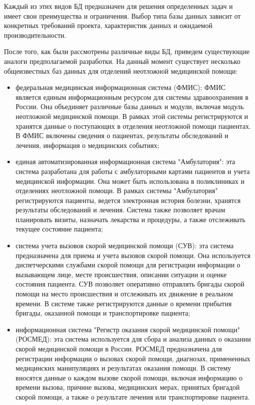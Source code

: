 Каждый из этих видов БД предназначен для решения определенных задач и имеет свои преимущества и ограничения. Выбор типа базы данных зависит от конкретных требований проекта, характеристик данных и ожидаемой производительности.

После того, как были рассмотрены различные виды БД, приведем существующие аналоги предполагаемой разработки. На данный момент существует несколько общеизвестных баз данных для отделений неотложной медицинской помощи:

\begin{itemize}
    \item федеральная медицинская информационная система (ФМИС): ФМИС является единым информационным ресурсом для системы здравоохранения в России. Она объединяет различные базы данных и модули, включая модуль неотложной медицинской помощи. В рамках этой системы регистрируются и хранятся данные о поступающих в отделения неотложной помощи пациентах. В ФМИС включены сведения о пациентах, результаты обследований и лечения, информация о медицинских событиях;
    \item единая автоматизированная информационная система "Амбулатория": эта система разработана для работы с амбулаторными картами пациентов и учета медицинской информации. Она может быть использована в поликлиниках и отделениях неотложной помощи. В рамках системы "Амбулатория" регистрируются пациенты, ведется электронная история болезни, хранятся результаты обследований и лечения. Система также позволяет врачам планировать визиты, назначать лекарства и процедуры, а также отслеживать текущее состояние пациента;
    \item система учета вызовов скорой медицинской помощи (СУВ): эта система предназначена для приема и учета вызовов скорой помощи. Она используется диспетчерскими службами скорой помощи для регистрации информации о вызывающем лице, месте происшествия, описании ситуации и оценке состояния пациента. СУВ позволяет оперативно отправлять бригады скорой помощи на место происшествия и отслеживать их движение в реальном времени. В системе также регистрируются данные о времени прибытия бригады, оказанной помощи и транспортировке пациента;
    \item информационная система "Регистр оказания скорой медицинской помощи" (РОСМЕД): эта система используется для сбора и анализа данных о оказании скорой медицинской помощи в России. РОСМЕД предназначена для регистрации информации о вызовах скорой помощи, диагнозах, примененных медицинских манипуляциях и результатах оказания помощи. В систему вносятся данные о каждом вызове скорой помощи, включая информацию о времени вызова, причине вызова, медицинских мерах, принятых бригадой скорой помощи, а также о результате лечения или транспортировке пациента.
\end{itemize}


